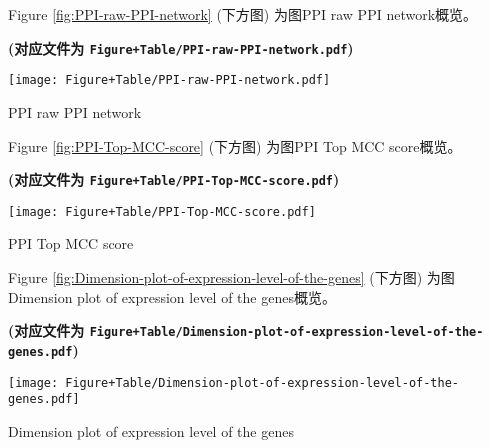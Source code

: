 \documentclass[
]{article}
\begin{document}
Figure \ref{fig:PPI-raw-PPI-network} (下方图) 为图PPI raw PPI network概览。

\textbf{(对应文件为 \texttt{Figure+Table/PPI-raw-PPI-network.pdf})}

\def\@captype{figure}
\begin{center}
\texttt{[image: Figure+Table/PPI-raw-PPI-network.pdf]}
\caption{PPI raw PPI network}\label{fig:PPI-raw-PPI-network}
\end{center}

\begin{center}\vspace{1.5cm}\end{center}

\begin{center}\vspace{1.5cm}\end{center}

Figure \ref{fig:PPI-Top-MCC-score} (下方图) 为图PPI Top MCC score概览。

\textbf{(对应文件为 \texttt{Figure+Table/PPI-Top-MCC-score.pdf})}

\def\@captype{figure}
\begin{center}
\texttt{[image: Figure+Table/PPI-Top-MCC-score.pdf]}
\caption{PPI Top MCC score}\label{fig:PPI-Top-MCC-score}
\end{center}

\begin{center}\vspace{1.5cm}\end{center}

\begin{center}\vspace{1.5cm}\end{center}

Figure \ref{fig:Dimension-plot-of-expression-level-of-the-genes} (下方图) 为图Dimension plot of expression level of the genes概览。

\textbf{(对应文件为 \texttt{Figure+Table/Dimension-plot-of-expression-level-of-the-genes.pdf})}

\def\@captype{figure}
\begin{center}
\texttt{[image: Figure+Table/Dimension-plot-of-expression-level-of-the-genes.pdf]}
\caption{Dimension plot of expression level of the genes}\label{fig:Dimension-plot-of-expression-level-of-the-genes}
\end{center}
\end{document}
